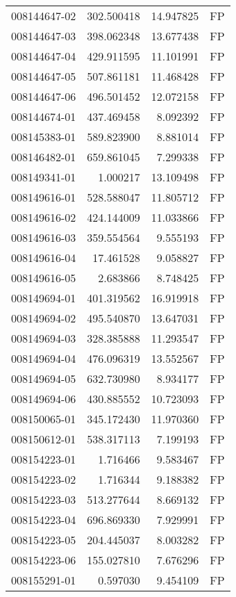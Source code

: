 \begin{tabular}{lrrl}
008144647-02 &  302.500418 &    14.947825 &   FP \\
008144647-03 &  398.062348 &    13.677438 &   FP \\
008144647-04 &  429.911595 &    11.101991 &   FP \\
008144647-05 &  507.861181 &    11.468428 &   FP \\
008144647-06 &  496.501452 &    12.072158 &   FP \\
008144674-01 &  437.469458 &     8.092392 &   FP \\
008145383-01 &  589.823900 &     8.881014 &   FP \\
008146482-01 &  659.861045 &     7.299338 &   FP \\
008149341-01 &    1.000217 &    13.109498 &   FP \\
008149616-01 &  528.588047 &    11.805712 &   FP \\
008149616-02 &  424.144009 &    11.033866 &   FP \\
008149616-03 &  359.554564 &     9.555193 &   FP \\
008149616-04 &   17.461528 &     9.058827 &   FP \\
008149616-05 &    2.683866 &     8.748425 &   FP \\
008149694-01 &  401.319562 &    16.919918 &   FP \\
008149694-02 &  495.540870 &    13.647031 &   FP \\
008149694-03 &  328.385888 &    11.293547 &   FP \\
008149694-04 &  476.096319 &    13.552567 &   FP \\
008149694-05 &  632.730980 &     8.934177 &   FP \\
008149694-06 &  430.885552 &    10.723093 &   FP \\
008150065-01 &  345.172430 &    11.970360 &   FP \\
008150612-01 &  538.317113 &     7.199193 &   FP \\
008154223-01 &    1.716466 &     9.583467 &   FP \\
008154223-02 &    1.716344 &     9.188382 &   FP \\
008154223-03 &  513.277644 &     8.669132 &   FP \\
008154223-04 &  696.869330 &     7.929991 &   FP \\
008154223-05 &  204.445037 &     8.003282 &   FP \\
008154223-06 &  155.027810 &     7.676296 &   FP \\
008155291-01 &    0.597030 &     9.454109 &   FP \\

\end{tabular}
